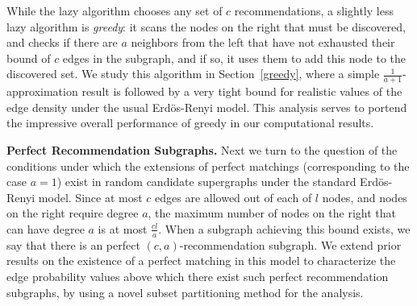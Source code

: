 \noindent
While the lazy algorithm chooses any set of $c$ recommendations, a slightly less lazy algorithm is {\em greedy}: it scans the nodes on the right that must be discovered, and checks if there are $a$ neighbors from the left that have not exhausted their bound of $c$ edges in the subgraph, and if so, it uses them to add this node to the discovered set. We study this algorithm in Section~\ref{greedy}, where a simple $\frac{1}{a+1}$-approximation result is followed by a very tight bound for realistic values of the edge density under the usual Erd\"os-Renyi model\cite{ErdosRenyi59}. This analysis serves to portend the impressive overall performance of greedy in our computational results.

\noindent
{\bf Perfect Recommendation Subgraphs.} Next we turn to the question of the conditions under which the extensions of perfect matchings (corresponding to the case $a=1$) exist in random candidate supergraphs under the standard Erd\"os-Renyi model. Since at most $c$ edges are allowed out of each of $l$ nodes, and nodes on the right require degree $a$, the maximum number of nodes on the right that can have degree $a$ is at most $\frac{cl}{a}$. When a subgraph achieving this bound exists, we say that there is an perfect $(c,a)$-recommendation subgraph. We extend prior results on the
existence of a perfect matching in this model to characterize the edge probability values above which there exist such perfect recommendation subgraphs, by using a novel subset partitioning method for the analysis. \vs
 

